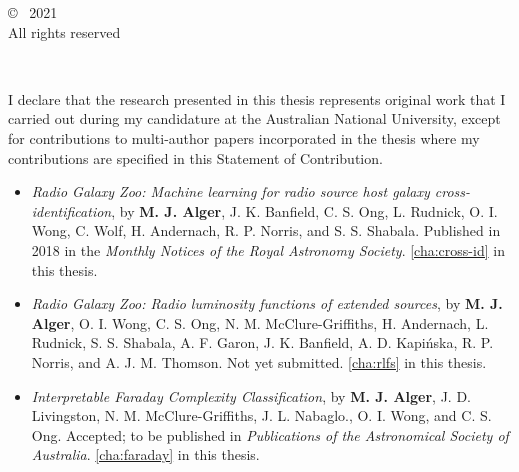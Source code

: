 \vspace*{14cm}
\begin{center}
  \makeatletter
  \copyright\ \@author{} 2021\\All rights reserved
  \makeatother
\end{center}
\noindent
\begin{center}
  \footnotesize{~} %
\end{center}
\noindent

\newpage






\vspace*{4cm}
    I declare that the research presented in this thesis represents original
    work that I carried out during my candidature at the Australian National
    University, except for contributions to multi-author papers incorporated
    in the thesis where my contributions are specified in this Statement of
    Contribution.

    \begin{itemize}
      \item \emph{Radio Galaxy Zoo: Machine learning for radio source host galaxy cross-identification}, by \textbf{M. J. Alger}, J. K. Banfield, C. S. Ong, L. Rudnick, O. I. Wong, C. Wolf, H. Andernach, R. P. Norris, and S. S. Shabala. Published in 2018 in the \emph{Monthly Notices of the Royal Astronomy Society}. \autoref{cha:cross-id} in this thesis.
      \item \emph{Radio Galaxy Zoo: Radio luminosity functions of extended sources}, by \textbf{M. J. Alger}, O. I. Wong, C. S. Ong, N. M. McClure-Griffiths, H. Andernach, L. Rudnick, S. S. Shabala, A. F. Garon, J. K. Banfield, A. D. Kapi\'nska, R. P. Norris, and A. J. M. Thomson. Not yet submitted. \autoref{cha:rlfs} in this thesis.
      \item \emph{Interpretable Faraday Complexity Classification}, by \textbf{M. J. Alger}, J. D. Livingston, N. M. McClure-Griffiths, J. L. Nabaglo., O. I. Wong, and C. S. Ong. Accepted; to be published in \emph{Publications of the Astronomical Society of Australia}. \autoref{cha:faraday} in this thesis.
    \end{itemize}

